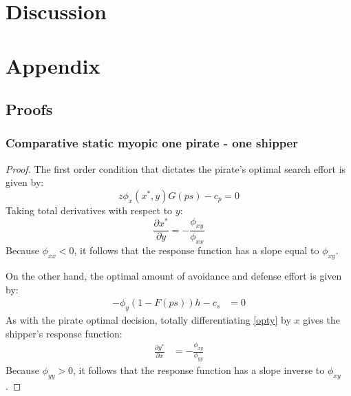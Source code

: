 \documentclass[11pt, oneside]{article}   	%
\begin{document}
\section{Discussion}

\pagebreak
\printbibliography

\section{Appendix}
\subsection{Proofs}
\subsubsection{Comparative static myopic one pirate - one shipper}
\begin{proof}
The first order condition that dictates the pirate's optimal search effort is given by:
\begin{equation}
z\phi_x(x^*,y)G(ps)-c_p=0
\end{equation}
Taking total derivatives with respect to $y$:
\begin{equation}
\frac{\partial x^*}{\partial y}=-\frac{\phi_{xy}}{\phi_{xx}}
\end{equation}
Because $\phi_{xx}<0$, it follows that the response function has a slope equal to $\phi_{xy}$.

On the other hand, the optimal amount of avoidance and defense effort is given by:
\begin{align}
-\phi_y\left(1-F(ps)\right)h-c_s&=0\label{opty}
\end{align}
As with the pirate optimal decision, totally differentiating \ref{opty}  by $x$ gives the shipper's response function:
\begin{align}
\frac{\partial y^*}{\partial x}&=-\frac{\phi_{xy}}{\phi_{yy}}
\end{align}
Because $\phi_{yy}>0$, it follows that the response function has a slope inverse to $\phi_{xy}$.
\end{proof}
\end{document}
